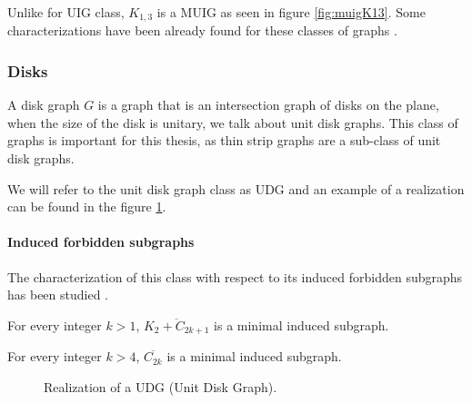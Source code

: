 Unlike for UIG class, $K_{1,3}$ is a MUIG as seen in figure \ref{fig:muigK13}. Some
characterizations have been already found for these classes of graphs \cite{shuchatUnitMixedInterval2014a}
\cite{joosCharacterizationMixedUnit2013}.


\subsubsection{Disks}

A disk graph $G$ is a graph that is an intersection graph of disks on the plane, when the size
of the disk is unitary, we talk about unit disk graphs. This class of graphs
is important for this thesis, as thin strip graphs are a sub-class of
unit disk graphs.

We will refer to the unit disk graph class as UDG and an example of a realization
can be found in the figure \ref{fig:udg}.

\paragraph{Induced forbidden subgraphs} The characterization of this class with respect to
its induced forbidden subgraphs has been studied \cite{atminasForbiddenInducedSubgraphs2016}.

\begin{theorem}
  For every integer $k > 1$, $\overline{K_2 + C_{2k+1}}$ is a minimal induced subgraph.
\end{theorem}

\begin{theorem}
  For every integer $k > 4$, $\overline{C_{2k}}$ is a minimal induced subgraph.
\end{theorem}

\begin{figure}
\centering

\begin{scaletikzpicturetowidth}{\textwidth}
\end{scaletikzpicturetowidth}

\caption{Realization of a UDG (Unit Disk Graph).}
\label{fig:udg}
\end{figure}
